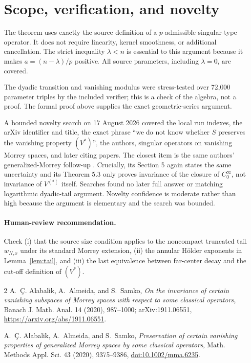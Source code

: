 \documentclass[11pt]{article}
\newcommand{\1}{\mathbf 1}
\begin{document}
\section{Scope, verification, and novelty}

The theorem uses exactly the source definition of a $p$-admissible
singular-type operator.  It does not require linearity, kernel smoothness, or
additional cancellation.  The strict inequality $\lambda<n$ is essential to
this argument because it makes $a=(n-\lambda)/p$ positive.  All source
parameters, including $\lambda=0$, are covered.

The dyadic transition and vanishing modulus were stress-tested over 72,000
parameter triples by the included verifier; this is a check of the algebra,
not a proof.  The formal proof above supplies the exact geometric-series
argument.

A bounded novelty search on 17 August 2026 covered the local run indexes,
the arXiv identifier and title, the exact phrase ``we do not know whether
$S$ preserves the vanishing property $(V^\ast)$'', the authors, singular
operators on vanishing Morrey spaces, and later citing papers.  The closest
item is the same authors' generalized-Morrey follow-up \cite{followup}.
Crucially, its Section 5 again states the same uncertainty and its Theorem 5.3
only proves invariance of the closure of $C_0^\infty$, not invariance of
$V^{(\ast)}$ itself.  Searches found no later full answer or matching
logarithmic dyadic-tail argument.  Novelty confidence is moderate rather than
high because the argument is elementary and the search was bounded.

\paragraph{Human-review recommendation.}
Check (i) that the source size condition applies to the noncompact truncated
tail $w_{N,x}$ under its standard Morrey extension, (ii) the annular H\"older
exponents in Lemma~\ref{lem:tail}, and (iii) the last equivalence between
far-center decay and the cut-off definition of $(V^\ast)$.

\begin{thebibliography}{2}
A.~\c{C}. Alabalik, A.~Almeida, and S.~Samko,
\emph{On the invariance of certain vanishing subspaces of Morrey spaces with
respect to some classical operators}, Banach J. Math. Anal. 14 (2020),
987--1000; arXiv:1911.06551,
\url{https://arxiv.org/abs/1911.06551}.

A.~\c{C}. Alabalik, A.~Almeida, and S.~Samko,
\emph{Preservation of certain vanishing properties of generalized Morrey
spaces by some classical operators}, Math. Methods Appl. Sci. 43 (2020),
9375--9386, \href{https://doi.org/10.1002/mma.6235}{doi:10.1002/mma.6235}.
\end{thebibliography}
\end{document}
